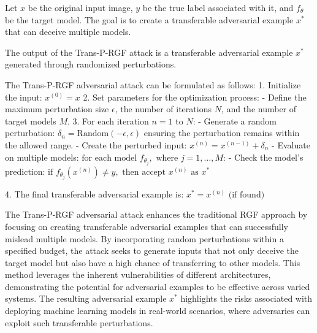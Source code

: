 Let $x$ be the original input image, $y$ be the true label associated with it, and $f_{\theta}$ be the target model. The goal is to create a transferable adversarial example $x^*$ that can deceive multiple models.

The output of the Trans-P-RGF attack is a transferable adversarial example $x^*$ generated through randomized perturbations.

The Trans-P-RGF adversarial attack can be formulated as follows:
1. Initialize the input:
   $x^{(0)} = x$
2. Set parameters for the optimization process:
   - Define the maximum perturbation size $\epsilon$, the number of iterations $N$, and the number of target models $M$.
3. For each iteration $n = 1$ to $N$:
   - Generate a random perturbation:
   $\delta_n = \text{Random}(-\epsilon, \epsilon)$
   ensuring the perturbation remains within the allowed range.
   - Create the perturbed input:
   $x^{(n)} = x^{(n-1)} + \delta_n$
   - Evaluate on multiple models:
   $\text{for each model } f_{\theta_j}, \text{ where } j = 1, \ldots, M$:
   - Check the model's prediction:
   $\text{if } f_{\theta_j}(x^{(n)}) \neq y, \text{ then accept } x^{(n)} \text{ as } x^*$

4. The final transferable adversarial example is:
   $x^* = x^{(n)} \text{ (if found)}$

The Trans-P-RGF adversarial attack enhances the traditional RGF approach by focusing on creating transferable adversarial examples that can successfully mislead multiple models. By incorporating random perturbations within a specified budget, the attack seeks to generate inputs that not only deceive the target model but also have a high chance of transferring to other models. This method leverages the inherent vulnerabilities of different architectures, demonstrating the potential for adversarial examples to be effective across varied systems. The resulting adversarial example $x^*$ highlights the risks associated with deploying machine learning models in real-world scenarios, where adversaries can exploit such transferable perturbations.
